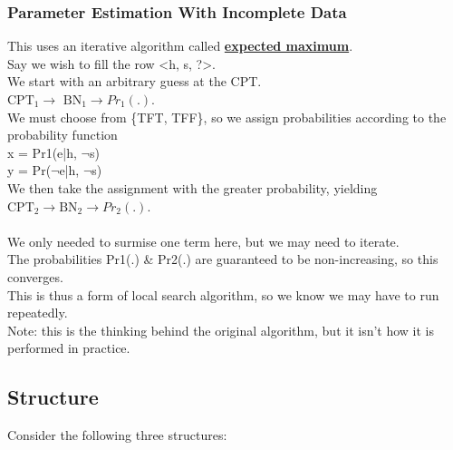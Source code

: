 \documentclass[../../lecture_notes.tex]{subfiles}
\begin{document}
\subsubsection*{Parameter Estimation With Incomplete Data}
\noindent This uses an iterative algorithm called \textbf{\underline{expected maximum}}.\\
Say we wish to fill the row <h, s, ?>.\\
We start with an arbitrary guess at the CPT.\\
	\indent $\text{CPT}_1 \rightarrow \text{ BN}_1 \rightarrow Pr_1(.)$.\\
We must choose from \{TFT, TFF\}, so we assign probabilities according to the probability function\\
	\indent x = Pr1(e|h, $\neg$s)\\
	\indent y = Pr($\neg$e|h, $\neg$s)\\
We then take the assignment with the greater probability, yielding\\
	\indent $\text{CPT}_2 \rightarrow \text{BN}_2 \rightarrow Pr_2(.)$.\\
\\
We only needed to surmise one term here, but we may need to iterate.\\
The probabilities Pr1(.) \& Pr2(.) are guaranteed to be non-increasing, so this converges.\\
This is thus a form of local search algorithm, so we know we may have to run repeatedly.\\
Note: this is the thinking behind the original algorithm, but it isn’t how it is performed in practice.\\

\subsection*{Structure}
\noindent Consider the following three structures:
\end{document}
